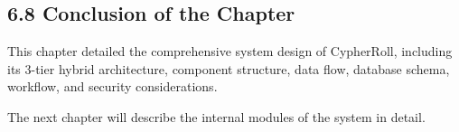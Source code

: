 \subsection*{6.8 Conclusion of the Chapter}
This chapter detailed the comprehensive system design of CypherRoll, including its 3-tier hybrid architecture, component structure, data flow, database schema, workflow, and security considerations.

The next chapter will describe the internal modules of the system in detail.
\label{chap:design_end}
